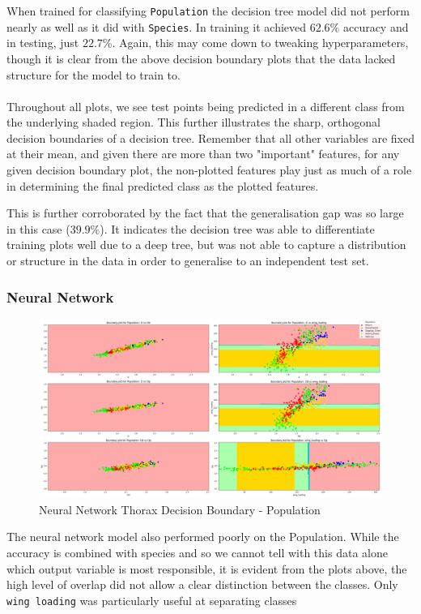 \documentclass{article}
\begin{document}
When trained for classifying \texttt{Population} the decision tree model did not perform nearly as well as it did with \texttt{Species}. In training it achieved $62.6\%$ accuracy and in testing, just $22.7\%$. Again, this may come down to tweaking hyperparameters, though it is clear from the above decision boundary plots that the data lacked structure for the model to train to. \\
\\
Throughout all plots, we see test points being predicted in a different class from the underlying shaded region. This further illustrates the sharp, orthogonal decision boundaries of a decision tree. Remember that all other variables are fixed at their mean, and given there are more than two "important" features, for any given decision boundary plot, the non-plotted features play just as much of a role in determining the final predicted class as the plotted features. 

This is further corroborated by the fact that the generalisation gap was so large in this case ($39.9\%$). It indicates the decision tree was able to differentiate training plots well due to a deep tree, but was not able to capture a distribution or structure in the data in order to generalise to an independent test set.

\newpage
\subsubsection{Neural Network}

\begin{figure}[htb]
    \centering
    \includegraphics[width=0.8\columnwidth]{plots/nn_Thorax_decision_boundaries_Population.png}
    \caption{Neural Network Thorax Decision Boundary - Population}
    \label{fig:nn_thorax_db_pop}
\end{figure}



The neural network model also performed poorly on the Population. While the accuracy is combined with species and so we cannot tell with this data alone which output variable is most responsible, it is evident from the plots above, the high level of overlap did not allow a clear distinction between the classes. Only \texttt{wing loading} was particularly useful at separating classes
\end{document}
